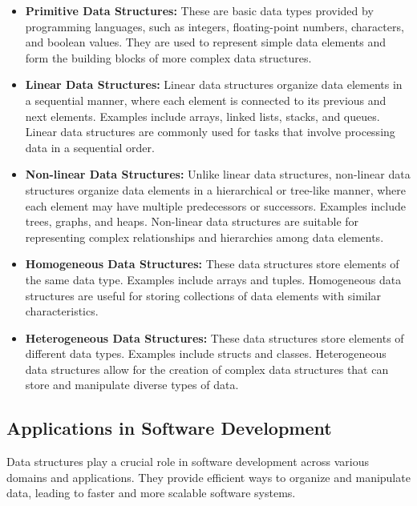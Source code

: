 \documentclass[12pt]{book} %
\begin{document}
\begin{itemize}
    \item \textbf{Primitive Data Structures:} These are basic data types provided by programming languages, such as integers, floating-point numbers, characters, and boolean values. They are used to represent simple data elements and form the building blocks of more complex data structures.
    
    \item \textbf{Linear Data Structures:} Linear data structures organize data elements in a sequential manner, where each element is connected to its previous and next elements. Examples include arrays, linked lists, stacks, and queues. Linear data structures are commonly used for tasks that involve processing data in a sequential order.
    
    \item \textbf{Non-linear Data Structures:} Unlike linear data structures, non-linear data structures organize data elements in a hierarchical or tree-like manner, where each element may have multiple predecessors or successors. Examples include trees, graphs, and heaps. Non-linear data structures are suitable for representing complex relationships and hierarchies among data elements.
    
    \item \textbf{Homogeneous Data Structures:} These data structures store elements of the same data type. Examples include arrays and tuples. Homogeneous data structures are useful for storing collections of data elements with similar characteristics.
    
    \item \textbf{Heterogeneous Data Structures:} These data structures store elements of different data types. Examples include structs and classes. Heterogeneous data structures allow for the creation of complex data structures that can store and manipulate diverse types of data.
\end{itemize}

\subsection{Applications in Software Development}

Data structures play a crucial role in software development across various domains and applications. They provide efficient ways to organize and manipulate data, leading to faster and more scalable software systems.
\end{document}
